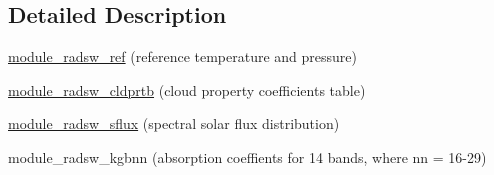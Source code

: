 \subsection{Detailed Description}

\begin{DoxyItemize}
\item \hyperlink{namespacemodule__radsw__ref}{module\+\_\+radsw\+\_\+ref} (reference temperature and pressure)
\item \hyperlink{namespacemodule__radsw__cldprtb}{module\+\_\+radsw\+\_\+cldprtb} (cloud property coefficients table)
\item \hyperlink{namespacemodule__radsw__sflux}{module\+\_\+radsw\+\_\+sflux} (spectral solar flux distribution)
\item module\+\_\+radsw\+\_\+kgbnn (absorption coeffients for 14 bands, where nn = 16-\/29) 
\end{DoxyItemize}